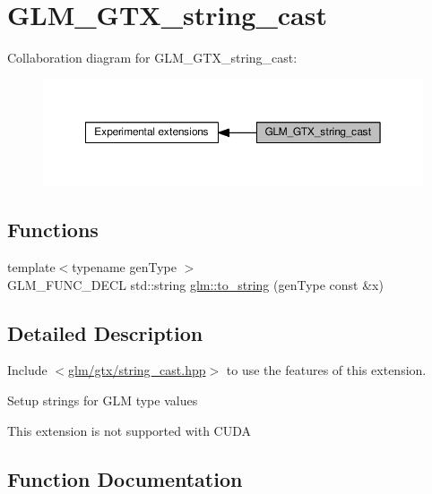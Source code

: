 \hypertarget{group__gtx__string__cast}{}\section{G\+L\+M\+\_\+\+G\+T\+X\+\_\+string\+\_\+cast}
\label{group__gtx__string__cast}
Collaboration diagram for G\+L\+M\+\_\+\+G\+T\+X\+\_\+string\+\_\+cast\+:
\nopagebreak
\begin{figure}[H]
\begin{center}
\leavevmode
\includegraphics[width=350pt]{df/dbe/group__gtx__string__cast}
\end{center}
\end{figure}
\subsection*{Functions}
\begin{DoxyCompactItemize}
\item 
{\footnotesize template$<$typename gen\+Type $>$ }\\G\+L\+M\+\_\+\+F\+U\+N\+C\+\_\+\+D\+E\+CL std\+::string \hyperlink{group__gtx__string__cast_ga8f0dced1fd45e67e2d77e80ab93c7af5}{glm\+::to\+\_\+string} (gen\+Type const \&x)
\end{DoxyCompactItemize}


\subsection{Detailed Description}
Include $<$\hyperlink{string__cast_8hpp}{glm/gtx/string\+\_\+cast.\+hpp}$>$ to use the features of this extension.

Setup strings for G\+LM type values

This extension is not supported with C\+U\+DA 

\subsection{Function Documentation}
\mbox{\label{group__gtx__string__cast_ga8f0dced1fd45e67e2d77e80ab93c7af5}} 

